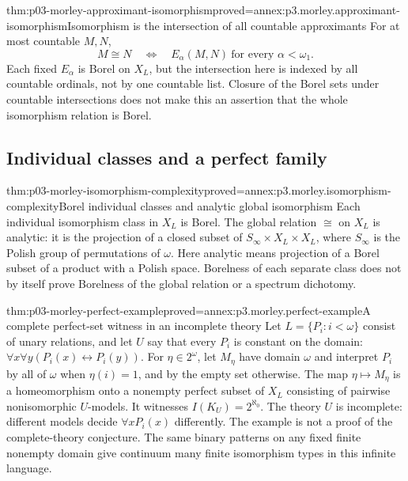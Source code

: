 \begin{hbcorollary}{thm:p03-morley-approximant-isomorphism}{proved=annex:p3.morley.approximant-isomorphism}{Isomorphism is the intersection of all countable approximants}
For at most countable \(M,N\),
\[
 M\cong N
       \quad\Longleftrightarrow\quad
 E_\alpha(M,N)\ \text{for every }\alpha<\omega_1.
\]
Each fixed \(E_\alpha\) is Borel on \(X_L\), but
the intersection here is indexed by all countable
ordinals, not by one countable list.
Closure of the Borel sets under countable intersections
does not make this an assertion that the whole
isomorphism relation is Borel.
\end{hbcorollary}

\subsection{Individual classes and a perfect family}
\label{sec:p03-morley-isomorphism-classes}

\begin{hbtheorem}{thm:p03-morley-isomorphism-complexity}{proved=annex:p3.morley.isomorphism-complexity}{Borel individual classes and analytic global isomorphism}
Each individual isomorphism class in \(X_L\) is Borel.
The global relation \(\cong\) on \(X_L\) is analytic:
it is the projection of a closed subset of
\(S_\infty\times X_L\times X_L\), where \(S_\infty\)
is the Polish group of permutations of \(\omega\).
Here analytic means projection of a Borel subset of
a product with a Polish space.
Borelness of each separate class does not by itself
prove Borelness of the global relation or a spectrum
dichotomy.
\end{hbtheorem}

\begin{hbtheorem}{thm:p03-morley-perfect-example}{proved=annex:p3.morley.perfect-example}{A complete perfect-set witness in an incomplete theory}
Let \(L=\{P_i:i<\omega\}\) consist of unary relations,
and let \(U\) say that every \(P_i\) is constant on
the domain:
\(\forall x\forall y(P_i(x)\leftrightarrow P_i(y))\).
For \(\eta\in2^\omega\), let \(M_\eta\) have domain
\(\omega\) and interpret \(P_i\) by all of \(\omega\)
when \(\eta(i)=1\), and by the empty set otherwise.
The map \(\eta\mapsto M_\eta\) is a homeomorphism
onto a nonempty perfect subset of \(X_L\) consisting
of pairwise nonisomorphic \(U\)-models.
It witnesses \(I(K_U)=2^{\aleph_0}\).
The theory \(U\) is incomplete: different models
decide \(\forall xP_i(x)\) differently.
The example is not a proof of the complete-theory
conjecture. The same binary patterns on any fixed
finite nonempty domain give continuum many finite
isomorphism types in this infinite language.
\end{hbtheorem}
